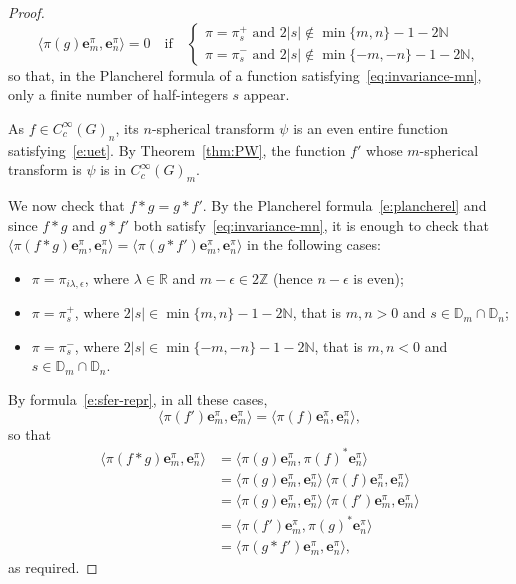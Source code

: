 \documentclass[10pt,a4paper]{amsart}
\newcommand{\Discr}{\mathbb{D}_m}
\newcommand{\R}{\mathbb{R}}
\newcommand{\Z}{\mathbb{Z}}
\newcommand{\eb}{\mathbf{e}}
\newcommand{\var}{s}
\begin{document}
\begin{proof}
%
\[
\langle \pi(g)\eb^\pi_m,\eb^\pi_n\rangle=0 \quad
\text{if}\quad
\begin{cases}
\pi=\pi_\var^+ \text{ and } 2|\var|\not\in \min\{m,n\}-1-2\mathbb N
\\[3pt]
\pi=\pi_\var^- \text{ and } 2|\var|\not\in\min\{-m,-n\}-1-2\mathbb N,
\end{cases} 
\]
so that, in the Plancherel formula of a function 
satisfying~\eqref{eq:invariance-mn}, only a finite number of half-integers $\var$ appear.

As  $f \in C^\infty_c(G)_n$, its $n$-spherical transform $\psi$ is an even entire function satisfying~\eqref{e:uet}. 
By Theorem~\ref{thm:PW}, the function $f'$ whose $m$-spherical transform is $\psi$
is in $C^\infty_c(G)_m$. 

We now check that $f*g=g*f'$. By the Plancherel formula~\eqref{e:plancherel} and 
since  $f*g$ and $g*f'$ both satisfy~\eqref{eq:invariance-mn}, it is enough to check that
$\langle \pi(f*g)\eb^\pi_m,\eb^\pi_n\rangle=\langle \pi(g*f')\eb^\pi_m,\eb^\pi_n\rangle$
in the following cases:
\begin{itemize}
\item $\pi=\pi_{i\lambda,\epsilon}$, where $\lambda\in \R $
and $m-\epsilon \in 2\Z$ (hence $n-\epsilon$ is even);
\item 
$\pi=\pi^+_s$, where $2|s|\in \min\{m,n\}-1-2\mathbb N$, that is $m,n>0$ and $s\in \Discr\cap{\mathbb{D}_n}$;
\item $\pi=\pi^-_s$, where $2|s| \in\min\{-m,-n\}-1-2\mathbb N$, that is $m,n<0$ and $s\in \Discr\cap{\mathbb{D}_n}$.
\end{itemize}

By formula~\eqref{e:sfer-repr}, 
in all these cases,  \[
\langle \pi(f')\eb^\pi_m, \eb^\pi_m\rangle=
\langle \pi(f)\eb^\pi_n, \eb^\pi_n\rangle,
\]
so that 
\begin{align*}
\langle \pi(f*g)\eb^\pi_m,\eb^\pi_n\rangle
&=\langle \pi(g)\eb^\pi_m,\pi(f)^*\eb^\pi_n\rangle
\\
&=\langle \pi(g)\eb^\pi_m,\eb^\pi_n\rangle\, \langle \pi(f)\eb^\pi_n, \eb^\pi_n\rangle
\\
&=\langle \pi(g)\eb^\pi_m,\eb^\pi_n\rangle\, \langle \pi(f')\eb^\pi_m, \eb^\pi_m\rangle 
\\
&=\langle \pi(f')\eb^\pi_m,\pi(g)^*\eb^\pi_n\rangle
\\
&=\langle \pi(g*f')\eb^\pi_m,\eb^\pi_n\rangle ,
\end{align*}
as required.
\end{proof}
\end{document}
